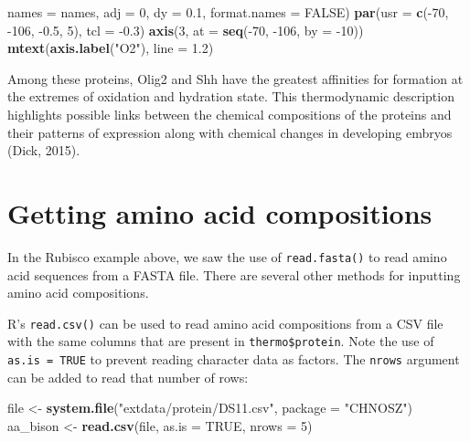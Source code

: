 \documentclass[]{tufte-book}
\newenvironment{Shaded}{}{}
\newcommand{\KeywordTok}[1]{\textcolor[rgb]{0.00,0.44,0.13}{\textbf{#1}}}
\newcommand{\DataTypeTok}[1]{\textcolor[rgb]{0.56,0.13,0.00}{#1}}
\newcommand{\DecValTok}[1]{\textcolor[rgb]{0.25,0.63,0.44}{#1}}
\newcommand{\FloatTok}[1]{\textcolor[rgb]{0.25,0.63,0.44}{#1}}
\newcommand{\StringTok}[1]{\textcolor[rgb]{0.25,0.44,0.63}{#1}}
\newcommand{\OtherTok}[1]{\textcolor[rgb]{0.00,0.44,0.13}{#1}}
\newcommand{\OperatorTok}[1]{\textcolor[rgb]{0.40,0.40,0.40}{#1}}
\newcommand{\NormalTok}[1]{#1}
\begin{document}
\begin{Shaded}
\begin{Highlighting}[]
  \DataTypeTok{names =}\NormalTok{ names, }\DataTypeTok{adj =} \DecValTok{0}\NormalTok{, }\DataTypeTok{dy =} \FloatTok{0.1}\NormalTok{, }\DataTypeTok{format.names =} \OtherTok{FALSE}\NormalTok{)}
\KeywordTok{par}\NormalTok{(}\DataTypeTok{usr =} \KeywordTok{c}\NormalTok{(}\OperatorTok{-}\DecValTok{70}\NormalTok{, }\OperatorTok{-}\DecValTok{106}\NormalTok{, }\OperatorTok{-}\FloatTok{0.5}\NormalTok{, }\DecValTok{5}\NormalTok{), }\DataTypeTok{tcl =} \OperatorTok{-}\FloatTok{0.3}\NormalTok{)}
\KeywordTok{axis}\NormalTok{(}\DecValTok{3}\NormalTok{, }\DataTypeTok{at =} \KeywordTok{seq}\NormalTok{(}\OperatorTok{-}\DecValTok{70}\NormalTok{, }\OperatorTok{-}\DecValTok{106}\NormalTok{, }\DataTypeTok{by =} \OperatorTok{-}\DecValTok{10}\NormalTok{))}
\KeywordTok{mtext}\NormalTok{(}\KeywordTok{axis.label}\NormalTok{(}\StringTok{"O2"}\NormalTok{), }\DataTypeTok{line =} \FloatTok{1.2}\NormalTok{)}
\end{Highlighting}
\end{Shaded}

Among these proteins, Olig2 and Shh have the greatest affinities for
formation at the extremes of oxidation and hydration state. This
thermodynamic description highlights possible links between the chemical
compositions of the proteins and their patterns of expression along with
chemical changes in developing embryos (Dick, 2015).

\section{Getting amino acid
compositions}\label{getting-amino-acid-compositions}

In the Rubisco example above, we saw the use of {\texttt{read.fasta()}}
to read amino acid sequences from a FASTA file. There are several other
methods for inputting amino acid compositions.

R's \texttt{read.csv()} can be used to read amino acid compositions from
a CSV file with the same columns that are present in
\texttt{thermo\$protein}. Note the use of \texttt{as.is\ =\ TRUE} to
prevent reading character data as factors. The \texttt{nrows} argument
can be added to read that number of rows:

\begin{Shaded}
\begin{Highlighting}[]
\NormalTok{file <-}\StringTok{ }\KeywordTok{system.file}\NormalTok{(}\StringTok{"extdata/protein/DS11.csv"}\NormalTok{, }\DataTypeTok{package =} \StringTok{"CHNOSZ"}\NormalTok{)}
\NormalTok{aa_bison <-}\StringTok{ }\KeywordTok{read.csv}\NormalTok{(file, }\DataTypeTok{as.is =} \OtherTok{TRUE}\NormalTok{, }\DataTypeTok{nrows =} \DecValTok{5}\NormalTok{)}
\end{Highlighting}
\end{Shaded}
\end{document}
